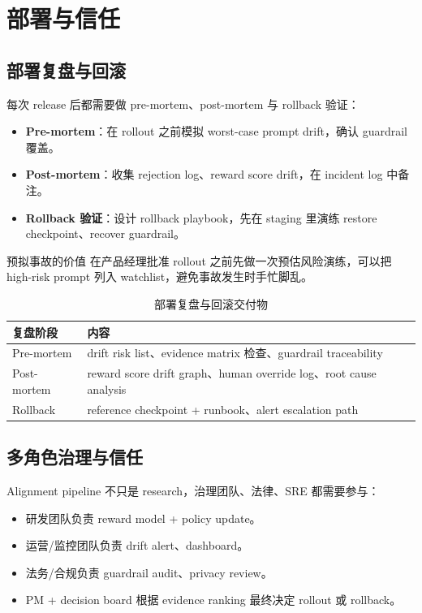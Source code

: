 \section{部署与信任}

\subsection{部署复盘与回滚}

每次 release 后都需要做 pre-mortem、post-mortem 与 rollback 验证：
\begin{itemize}
    \item \textbf{Pre-mortem}：在 rollout 之前模拟 worst-case prompt drift，确认 guardrail 覆盖。
    \item \textbf{Post-mortem}：收集 rejection log、reward score drift，在 incident log 中备注。
    \item \textbf{Rollback 验证}：设计 rollback playbook，先在 staging 里演练 restore checkpoint、recover guardrail。
\end{itemize}

\begin{importantbox}{预拟事故的价值}
在产品经理批准 rollout 之前先做一次预估风险演练，可以把 high-risk prompt 列入 watchlist，避免事故发生时手忙脚乱。
\end{importantbox}

\begin{table}[H]
\centering
\begin{tabular}{p{} p{}}
\toprule
复盘阶段 & 内容 \\
\midrule
Pre-mortem & drift risk list、evidence matrix 检查、guardrail traceability \\
Post-mortem & reward score drift graph、human override log、root cause analysis \\
Rollback & reference checkpoint + runbook、alert escalation path \\
\bottomrule
\end{tabular}
\caption{部署复盘与回滚交付物}
\end{table}

\subsection{多角色治理与信任}

Alignment pipeline 不只是 research，治理团队、法律、SRE 都需要参与：
\begin{itemize}
    \item 研发团队负责 reward model + policy update。
    \item 运营/监控团队负责 drift alert、dashboard。
    \item 法务/合规负责 guardrail audit、privacy review。
    \item PM + decision board 根据 evidence ranking 最终决定 rollout 或 rollback。
\end{itemize}

